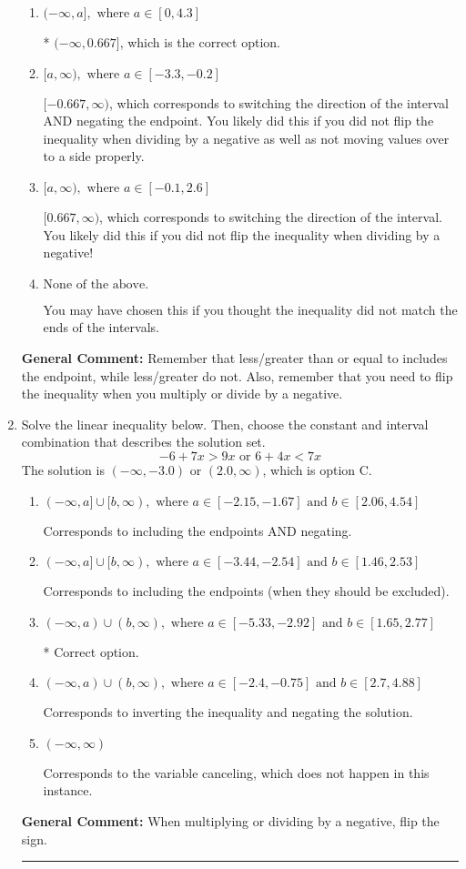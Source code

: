 \documentclass{extbook}[14pt]
\newcommand{\litem}[1]{\item #1

\rule{\textwidth}{0.4pt}}
\begin{document}
\begin{enumerate}
{\begin{enumerate}[label=\Alph*.]
 $(-\infty, -0.667]$, which corresponds to negating the endpoint of the solution.
\item \( (-\infty, a], \text{ where } a \in [0, 4.3] \)

* $(-\infty, 0.667]$, which is the correct option.
\item \( [a, \infty), \text{ where } a \in [-3.3, -0.2] \)

 $[-0.667, \infty)$, which corresponds to switching the direction of the interval AND negating the endpoint. You likely did this if you did not flip the inequality when dividing by a negative as well as not moving values over to a side properly.
\item \( [a, \infty), \text{ where } a \in [-0.1, 2.6] \)

 $[0.667, \infty)$, which corresponds to switching the direction of the interval. You likely did this if you did not flip the inequality when dividing by a negative!
\item \( \text{None of the above}. \)

You may have chosen this if you thought the inequality did not match the ends of the intervals.
\end{enumerate}

\textbf{General Comment:} Remember that less/greater than or equal to includes the endpoint, while less/greater do not. Also, remember that you need to flip the inequality when you multiply or divide by a negative.
}
\litem{
Solve the linear inequality below. Then, choose the constant and interval combination that describes the solution set.
\[ -6 + 7 x > 9 x \text{ or } 6 + 4 x < 7 x \]The solution is \( (-\infty, -3.0) \text{ or } (2.0, \infty) \), which is option C.\begin{enumerate}[label=\Alph*.]
\item \( (-\infty, a] \cup [b, \infty), \text{ where } a \in [-2.15, -1.67] \text{ and } b \in [2.06, 4.54] \)

Corresponds to including the endpoints AND negating.
\item \( (-\infty, a] \cup [b, \infty), \text{ where } a \in [-3.44, -2.54] \text{ and } b \in [1.46, 2.53] \)

Corresponds to including the endpoints (when they should be excluded).
\item \( (-\infty, a) \cup (b, \infty), \text{ where } a \in [-5.33, -2.92] \text{ and } b \in [1.65, 2.77] \)

 * Correct option.
\item \( (-\infty, a) \cup (b, \infty), \text{ where } a \in [-2.4, -0.75] \text{ and } b \in [2.7, 4.88] \)

Corresponds to inverting the inequality and negating the solution.
\item \( (-\infty, \infty) \)

Corresponds to the variable canceling, which does not happen in this instance.
\end{enumerate}

\textbf{General Comment:} When multiplying or dividing by a negative, flip the sign.
}
\end{enumerate}
\end{document}
